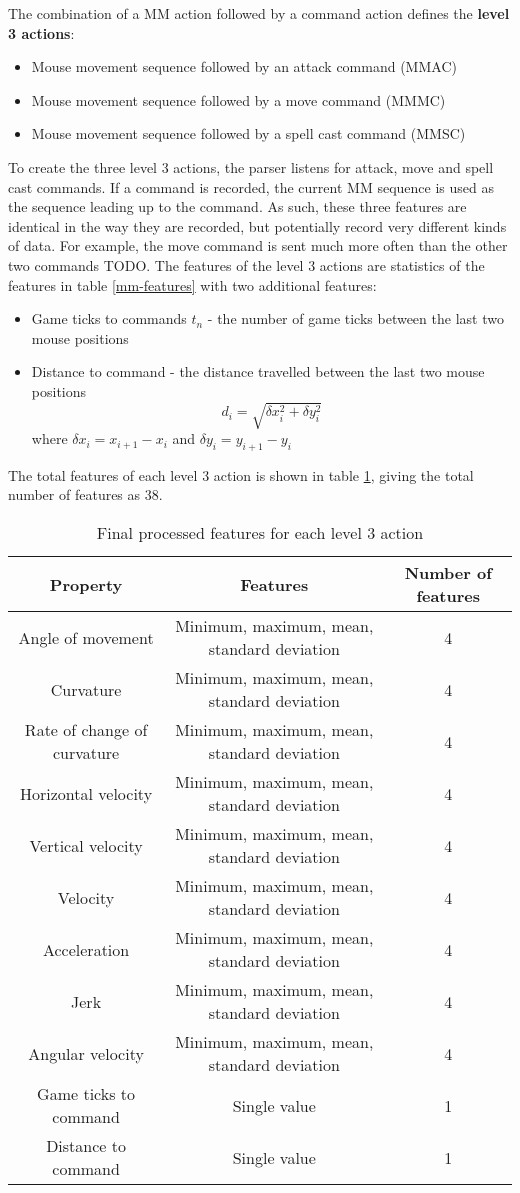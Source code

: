 \documentclass{../sty/SizheArticle}
\begin{document}
The combination of a MM action followed by a command action defines the \textbf{level 3 actions}:
\begin{itemize}
\item Mouse movement sequence followed by an attack command (MMAC)
\item Mouse movement sequence followed by a move command (MMMC)
\item Mouse movement sequence followed by a spell cast command (MMSC)
\end{itemize}
To create the three level 3 actions, the parser listens for attack, move and spell cast commands. If a command is recorded, the current MM sequence is used as the sequence leading up to the command. As such, these three features are identical in the way they are recorded, but potentially record very different kinds of data. For example, the move command is sent much more often than the other two commands TODO. The features of the level 3 actions are statistics of the features in table \ref{mm-features} with two additional features:
\begin{itemize}
\item Game ticks to commands $t_n$ - the number of game ticks between the last two mouse positions
\item Distance to command - the distance travelled between the last two mouse positions
\begin{equation}
d_i = \sqrt{\delta x_{i}^2 + \delta y_{i}^2}
\end{equation} 
where $\delta x_i = x_{i+1} - x_i$ and $\delta y_i = y_{i+1} - y_i$
\end{itemize}

The total features of each level 3 action is shown in table \ref{tbl-level3features}, giving the total number of features as 38. 
\newcommand{\fourfeatures}[1]{#1 & Minimum, maximum, mean, standard deviation & 4 \\ \hline}
\begin{table}[H]
\renewcommand*{\arraystretch}{1.5}
\centering
\begin{tabular}{| c | c | c |}
\hline
\textbf{Property} & \textbf{Features} & \textbf{Number of features} \\ \hline
\fourfeatures{Angle of movement}
\fourfeatures{Curvature}
\fourfeatures{Rate of change of curvature}
\fourfeatures{Horizontal velocity}
\fourfeatures{Vertical velocity}
\fourfeatures{Velocity}
\fourfeatures{Acceleration}
\fourfeatures{Jerk}
\fourfeatures{Angular velocity}
Game ticks to command & Single value & 1 \\ \hline
Distance to command & Single value & 1 \\ \hline
\end{tabular}
\caption{Final processed features for each level 3 action}
\label{tbl-level3features}
\end{table}
\end{document}
